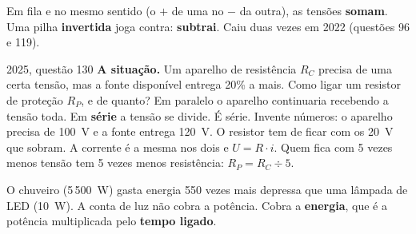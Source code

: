 \begin{minipage}[c]{0.40\linewidth}\centering
{}
\end{minipage}\hfill
\begin{minipage}[c]{0.57\linewidth}
\begin{macete}
Em fila e no mesmo sentido (o $+$ de uma no $-$ da outra), as tensões \textbf{somam}. Uma pilha \textbf{invertida} joga contra: \textbf{subtrai}.
Caiu duas vezes em 2022 (questões 96 e 119).
\end{macete}
\end{minipage}

\begin{enemreal}{2025, questão 130}
\textbf{A situação.} Um aparelho de resistência $R_C$ precisa de uma certa tensão, mas a fonte disponível entrega 20\% a mais.
Como ligar um resistor de proteção $R_P$, e de quanto?
 Em paralelo o aparelho continuaria recebendo a tensão toda. Em \textbf{série} a tensão se divide. É série.
 Invente números: o aparelho precisa de 100~V e a fonte entrega 120~V. O resistor tem de ficar com os 20~V que sobram.
A corrente é a mesma nos dois e $U = R \cdot i$. Quem fica com 5 vezes menos tensão tem 5 vezes menos resistência: $R_P = R_C \div 5$.
\end{enemreal}


\begin{analogia}
O chuveiro (5\,500~W) gasta energia 550 vezes mais depressa que uma lâmpada de LED (10~W).
A conta de luz não cobra a potência. Cobra a \textbf{energia}, que é a potência multiplicada pelo \textbf{tempo ligado}.
\end{analogia}

